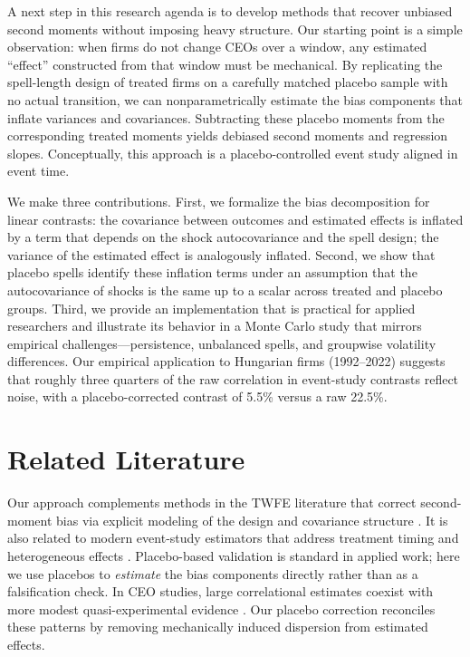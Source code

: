 \documentclass[11pt,a4paper]{article}
\begin{document}
A next step in this research agenda is to develop methods that recover unbiased second moments without imposing heavy structure. Our starting point is a simple observation: when firms do not change CEOs over a window, any estimated “effect” constructed from that window must be mechanical. By replicating the spell-length design of treated firms on a carefully matched placebo sample with no actual transition, we can nonparametrically estimate the bias components that inflate variances and covariances. Subtracting these placebo moments from the corresponding treated moments yields debiased second moments and regression slopes. Conceptually, this approach is a placebo-controlled event study aligned in event time.

We make three contributions. First, we formalize the bias decomposition for linear contrasts: the covariance between outcomes and estimated effects is inflated by a term that depends on the shock autocovariance and the spell design; the variance of the estimated effect is analogously inflated. Second, we show that placebo spells identify these inflation terms under an assumption that the autocovariance of shocks is the same up to a scalar across treated and placebo groups. Third, we provide an implementation that is practical for applied researchers and illustrate its behavior in a Monte Carlo study that mirrors empirical challenges—persistence, unbalanced spells, and groupwise volatility differences. Our empirical application to Hungarian firms (1992--2022) suggests that roughly three quarters of the raw correlation in event-study contrasts reflect noise, with a placebo-corrected contrast of 5.5\% versus a raw 22.5\%.

\section{Related Literature}

Our approach complements methods in the TWFE literature that correct second-moment bias via explicit modeling of the design and covariance structure \citep{andrews2008high,Bonhomme2023-dx}. It is also related to modern event-study estimators that address treatment timing and heterogeneous effects \citep{Callaway2021JoLE}. Placebo-based validation is standard in applied work; here we use placebos to \emph{estimate} the bias components directly rather than as a falsification check. In CEO studies, large correlational estimates coexist with more modest quasi-experimental evidence \citep{bennedsen2020ceos}. Our placebo correction reconciles these patterns by removing mechanically induced dispersion from estimated effects.
\end{document}
